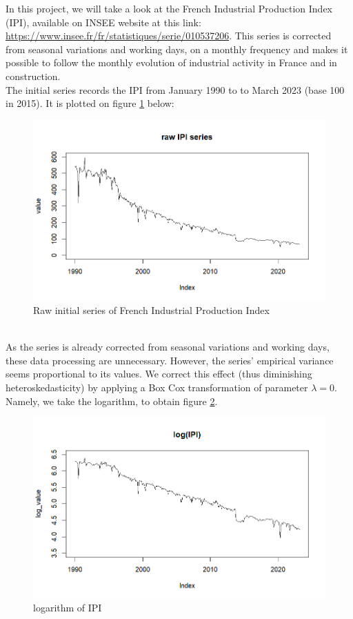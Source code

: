 \documentclass[]{article}
\begin{document}
In this project, we will take a look at the French Industrial Production Index (IPI), available on INSEE website at this link: \url{https://www.insee.fr/fr/statistiques/serie/010537206}.
This series is corrected from seasonal variations and working days, on a monthly frequency and makes it possible to follow the monthly evolution of industrial activity in France and in construction.\\
The initial series records the IPI from January 1990 to to March 2023 (base 100 in 2015). It is plotted on figure \ref{rawSeries} below:
\begin{figure}[h!]
	\centering
	\includegraphics[scale=0.6]{raw_series.png}
	\caption{Raw initial series of French Industrial Production Index}
	\label{rawSeries}
\end{figure}\\
As the series is already corrected from seasonal variations and working days, these data processing are unnecessary. However, the series' empirical variance seems proportional to its values. We correct this effect (thus diminishing heteroskedasticity) by applying a Box Cox transformation of parameter $\lambda = 0$. Namely, we take the logarithm, to obtain figure \ref{logSeries}.
\begin{figure}[h!]
	\centering
	\includegraphics[scale=0.6]{log_series.png}
	\caption{logarithm of IPI}
	\label{logSeries}
\end{figure}
\end{document}
